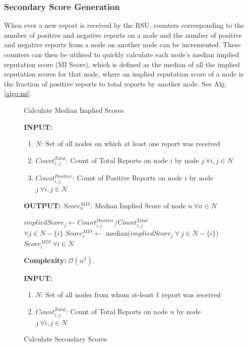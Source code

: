 \documentclass[journal]{IEEEtran}
\makeatletter
\newcommand{\removelatexerror}{\let\@latex@error\@gobble}
\makeatother
\begin{document}
\subsubsection{Secondary Score Generation}
When ever a new report is received by the RSU, counters corresponding to the number of positive and negative reports on a node and the number of positive and negative reports from a node on another node can be incremented. These counters can then be utilised to quickly calculate each node's median implied reputation score (MI Score), which is defined as the median of all the implied reputation scores for that node, where an implied reputation score of a node is the fraction of positive reports to total reports by another node. See %
Alg. \ref{algo:mi}.
\begin{figure}[!t]\removelatexerror
	\label{fig:ALG_ss}
\begin{algorithm}[H]
	\caption{Calculate Median Implied Scores}  
	\label{algo:mi} 
	\textbf{INPUT:} 
	\begin{enumerate}
		\item $N$: Set of all nodes on which at least one report was received
		\item $Count^{Total}_{i,j}$: Count of Total Reports on node $ i $ by node $ j \ \forall i,j\in N $
		\item $Count^{Positive}_{i,j}$: Count of Positive Reports on node $ i $ by node $ j \ \forall i,j\in N $
	\end{enumerate}
	\textbf{OUTPUT:}  $Score^{MIS}_n$: Median Implied Score of node $n\ \forall n\in N$
	\begin{algorithmic}[1]
			\STATE $impliedScore_{j} \leftarrow Count^{Positive}_{i,j} / Count^{Total}_{i,j}$\\$\forall j \in N-\{i\} $
			\STATE $ Score^{MIS}_i \leftarrow$ median($impliedScore_j\ \forall\ j\in N-\{i\}$)
		\ENDFOR
		\RETURN $Score^{MIS}_i\ \forall i\in N$
	\end{algorithmic}
	\textbf{Complexity:} $\mathcal{O}(n^2)$.
\end{algorithm}
\begin{algorithm}[H]
	\caption{Calculate Secondary Scores}
	\label{algo:SSCalc}
	\textbf{INPUT:} 
	\begin{enumerate}
		\item $N$: Set of all nodes from whom at-least 1 report was received
		\item $Count^{Total}_{i,j}$: Count of Total Reports on node $ n $ by node $ j \ \forall i,j\in N $

\end{enumerate}
\end{algorithm}
\end{figure}
\end{document}
